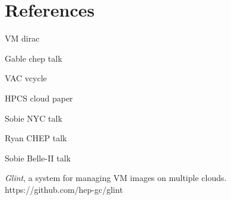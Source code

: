 \documentclass[a4paper]{jpconf}
\begin{document}
\section*{References}
\begin{thebibliography}{9}

VM dirac

Gable chep talk

VAC vcycle

HPCS cloud paper

Sobie NYC talk

Ryan CHEP talk

Sobie Belle-II talk


{\it Glint}, a system for managing VM images on multiple clouds.
https://github.com/hep-gc/glint

\end{thebibliography}
\end{document}
